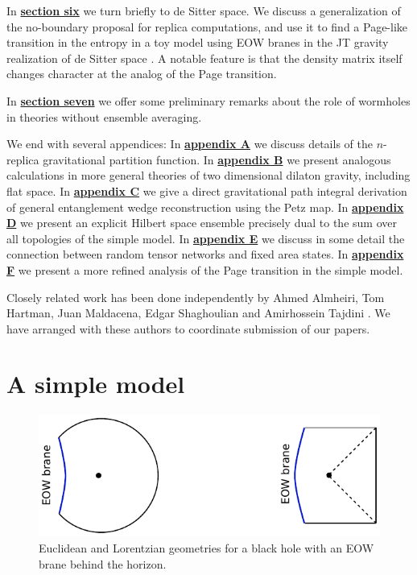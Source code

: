 \documentclass[11pt]{article}
\numberwithin{equation}{section}
\begin{document}

In \hyperref[sec:desitter]{{\bf section six}} we turn briefly to de Sitter space. We discuss a generalization of the no-boundary proposal for replica computations, and use it to find a Page-like transition in the entropy in a toy model using EOW branes in the JT gravity realization of de Sitter space \cite{Maldacena:2019cbz}.  A notable feature is that the density matrix itself changes character at the analog of the Page transition.

In \hyperref[sec:discussion]{{\bf section seven}} we offer some preliminary remarks about the role of wormholes in theories without ensemble averaging.  


We end with  several appendices: In \hyperref[app:zn]{\bf appendix A} we discuss details of the $n$-replica gravitational partition function. In \hyperref[app:dilatongravity]{\bf appendix B} we present analogous calculations in more general theories of two dimensional dilaton gravity, including flat space. In \hyperref[app:ew]{\bf appendix C} we give a direct gravitational path integral derivation of general entanglement wedge reconstruction using the Petz map. In \hyperref[app:ensemble]{\bf appendix D} we present an explicit Hilbert space ensemble precisely dual to the sum over all topologies of the simple model. In \hyperref[app:pagephases]{\bf appendix E} we discuss in some detail the connection between random tensor networks and fixed area states. In \hyperref[app:pagephases]{\bf appendix F} we present a more refined analysis  of the Page transition in the simple model.

\vspace{1em}
Closely related work has been done independently by Ahmed Almheiri, Tom Hartman, Juan Maldacena, Edgar Shaghoulian and Amirhossein Tajdini \cite{Almheiri:2019qdq}.  We have arranged with these authors to coordinate submission of our papers.


\section{A simple model}\label{sec:asimplemodel}
\begin{figure}[t]
\begin{center}
\includegraphics[scale = .95]{images/1.pdf}
\caption{{\small Euclidean and Lorentzian geometries for a black hole with an EOW brane behind the horizon.}}\label{fig1}
\end{center}
\end{figure}
\end{document}
